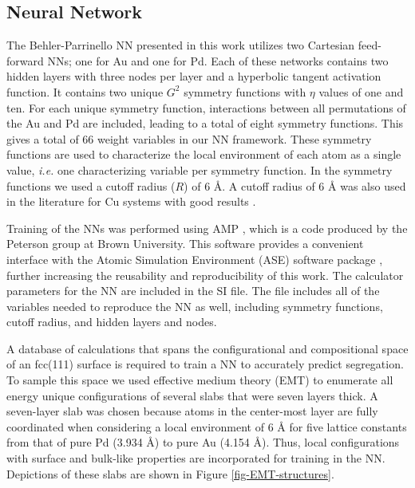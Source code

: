 \documentclass[12pt]{cmuthesis}
\begin{document}
\subsection{Neural Network}
\label{sec:org74e7823}
The Behler-Parrinello NN \cite{behler-2007-gener-neural,behler-2011-atom} presented in this work utilizes two Cartesian feed-forward NNs; one for Au and one for Pd. Each of these networks contains two hidden layers with three nodes per layer and a hyperbolic tangent activation function. It contains two unique \(G^{2}\) symmetry functions with \(\eta\) values of one and ten. For each unique symmetry function, interactions between all permutations of the Au and Pd are included, leading to a total of eight symmetry functions. This gives a total of 66 weight variables in our NN framework. These symmetry functions are used to characterize the local environment of each atom as a single value, \emph{i.e.} one characterizing variable per symmetry function.  In the symmetry functions we used a cutoff radius (\(R\)) of 6 \AA{}.  A cutoff radius of 6 \AA{} was also used in the literature for Cu systems with good results \cite{artrith-2012-high}.

Training of the NNs was performed using AMP \cite{khorshidi-2016-amp}, which is a code produced by the Peterson group at Brown University. This software provides a convenient interface with the Atomic Simulation Environment (ASE) software package \cite{bahn-2002-objec-orien}, further increasing the reusability and reproducibility of this work. The calculator parameters for the NN are included in the SI file. The file includes all of the variables needed to reproduce the NN as well, including symmetry functions, cutoff radius, and hidden layers and nodes.

A database of calculations that spans the configurational and compositional space of an fcc(111) surface is required to train a NN to accurately predict segregation. To sample this space we used effective medium theory (EMT) \cite{jacobsen-1996-semi-empir} to enumerate all energy unique configurations of several slabs that were seven layers thick. A seven-layer slab was chosen because atoms in the center-most layer are fully coordinated when considering a local environment of 6 \AA{} for five lattice constants from that of pure Pd (3.934 \AA{}) to pure Au (4.154 \AA{}). Thus, local configurations with surface and bulk-like properties are incorporated for training in the NN. Depictions of these slabs are shown in Figure \ref{fig-EMT-structures}.
\end{document}
